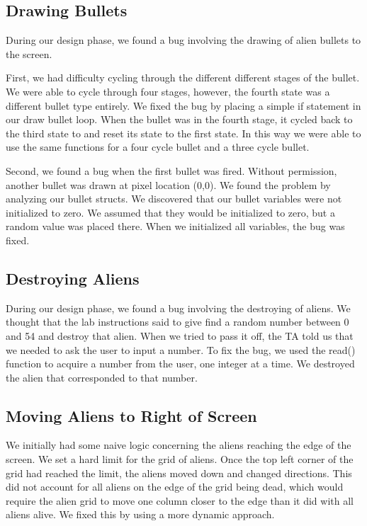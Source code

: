 \documentclass[11pt,letter,oneside]{report}
\begin{document}
\subsection{Drawing Bullets}
During our design phase, we found a bug involving the drawing of alien bullets to the screen. 

First, we had difficulty cycling through the different different stages of the bullet. We were able to cycle through four stages, however, the fourth state was a different bullet type entirely. We fixed the bug by placing a simple if statement in our draw bullet loop. When the bullet was in the fourth stage, it cycled back to the third state to and reset its state to the first state. In this way we were able to use the same functions for a four cycle bullet and a three cycle bullet.

Second, we found a bug when the first bullet was fired. Without permission, another bullet was drawn at pixel location (0,0). We found the problem by analyzing our bullet structs. We discovered that our bullet variables were not initialized to zero. We assumed that they would be initialized to zero, but a random value was placed there. When we initialized all variables, the bug was fixed.

\subsection{Destroying Aliens}
During our design phase, we found a bug involving the destroying of aliens. We thought that the lab instructions said to give find a random number between 0 and 54 and destroy that alien. When we tried to pass it off, the TA told us that we needed to ask the user to input a number. To fix the bug, we used the read() function to acquire a number from the user, one integer at a time. We destroyed the alien that corresponded to that number.

\subsection{Moving Aliens to Right of Screen}
We initially had some naive logic concerning the aliens reaching the edge of the screen.  We set a hard limit for the grid of aliens.  Once the top left corner of the grid had reached the limit, the aliens moved down and changed directions.  This did not account for all aliens on the edge of the grid being dead, which would require the alien grid to move one column closer to the edge than it did with all aliens alive.  We fixed this by using a more dynamic approach.
\end{document}
